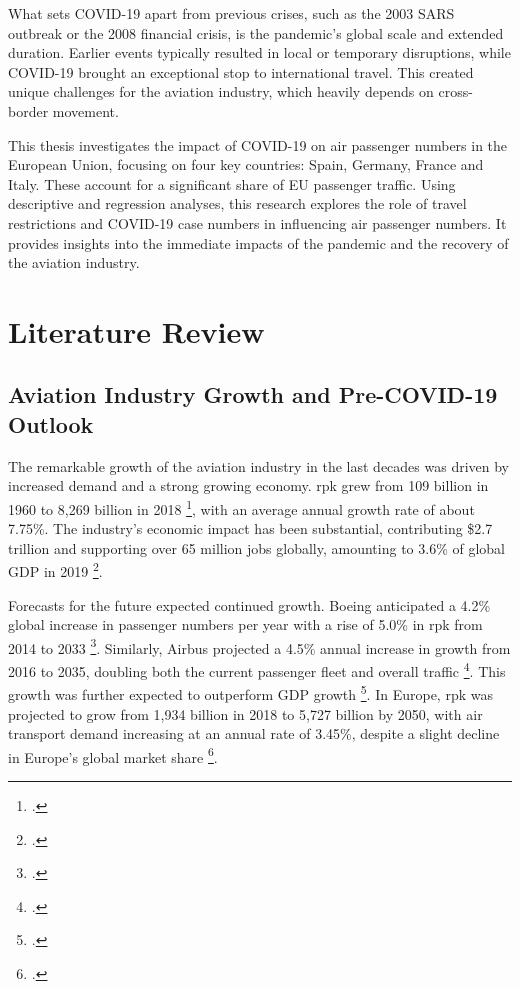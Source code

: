 \documentclass[12pt,onehalfspacing,headsepline,oneside,openright,a4paper, fleqn]{report}
\begin{document}
What sets COVID-19 apart from previous crises, such as the 2003 SARS outbreak or the 2008 financial crisis, is the pandemic's global scale and extended duration. Earlier events typically resulted in local or temporary disruptions, while COVID-19 brought an exceptional stop to international travel. This created unique challenges for the aviation industry, which heavily depends on cross-border movement.

This thesis investigates the impact of COVID-19 on air passenger numbers in the European Union, focusing on four key countries: Spain, Germany, France and Italy. These account for a significant share of EU passenger traffic. Using descriptive and regression analyses, this research explores the role of travel restrictions and COVID-19 case numbers in influencing air passenger numbers. It provides insights into the immediate impacts of the pandemic and the recovery of the aviation industry.

\chapter{Literature Review}
\section{Aviation Industry Growth and Pre-COVID-19 Outlook}

The remarkable growth of the aviation industry in the last decades was driven by increased demand and a strong growing economy. \gls{rpk} grew from 109 billion in 1960 to 8,269 billion in 2018 \footcite[2]{LEE2021}, with an average annual growth rate of about 7.75\%.  The industry’s economic impact has been substantial, contributing \$2.7 trillion and supporting over 65 million jobs globally, amounting to 3.6\% of global GDP in 2019 \footcite[3]{iata2019}. 

Forecasts for the future expected continued growth. Boeing anticipated a 4.2\% global increase in passenger numbers per year with a rise of 5.0\% in \gls{rpk} from 2014 to 2033 \footcite[3]{boeing2014}. Similarly, Airbus projected a 4.5\% annual increase in growth from 2016 to 2035, doubling both the current passenger fleet and overall traffic \footcite[10]{airbus2016}. This growth was further expected to outperform GDP growth \footcite[37]{airbus2019}. In Europe, \gls{rpk} was projected to grow from 1,934 billion in 2018 to 5,727 billion by 2050, with air transport demand increasing at an annual rate of 3.45\%, despite a slight decline in Europe's global market share \footcite[5]{gossling2020a}.
\end{document}
